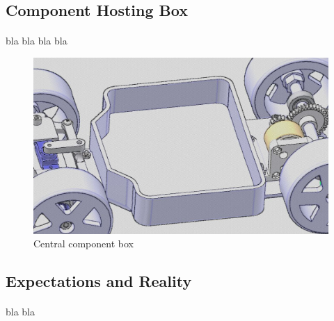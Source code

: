 \subsection{Component Hosting Box}
\paragraph{}
bla
bla
bla
bla

\begin{figure}[!ht]
    \begin{center}
        \includegraphics[scale=0.45]{Images/kart_central_box.png}
    \end{center}
    \caption{Central component box}
    \label{fig:raspi_config}
\end{figure}

\subsection{Expectations and Reality}
\paragraph{}
bla bla


